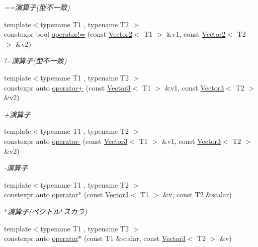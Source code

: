 \begin{DoxyCompactItemize}
\begin{DoxyCompactList}\small\item\em ==演算子(型不一致) \end{DoxyCompactList}\item 
{\footnotesize template$<$typename T1 , typename T2 $>$ }\\constexpr bool \mbox{\hyperlink{namespacesaki_a778d46d9fe6118407c686cc3c3c61ac7}{operator!=}} (const \mbox{\hyperlink{classsaki_1_1_vector2}{Vector2}}$<$ T1 $>$ \&v1, const \mbox{\hyperlink{classsaki_1_1_vector2}{Vector2}}$<$ T2 $>$ \&v2)
\begin{DoxyCompactList}\small\item\em !=演算子(型不一致) \end{DoxyCompactList}\item 
{\footnotesize template$<$typename T1 , typename T2 $>$ }\\constexpr auto \mbox{\hyperlink{namespacesaki_a482be906f8ccfd7fa303391e28e44f05}{operator+}} (const \mbox{\hyperlink{classsaki_1_1_vector3}{Vector3}}$<$ T1 $>$ \&v1, const \mbox{\hyperlink{classsaki_1_1_vector3}{Vector3}}$<$ T2 $>$ \&v2)
\begin{DoxyCompactList}\small\item\em +演算子 \end{DoxyCompactList}\item 
{\footnotesize template$<$typename T1 , typename T2 $>$ }\\constexpr auto \mbox{\hyperlink{namespacesaki_ab4e324d1879fdeb0737196f18a3b42e2}{operator-\/}} (const \mbox{\hyperlink{classsaki_1_1_vector3}{Vector3}}$<$ T1 $>$ \&v1, const \mbox{\hyperlink{classsaki_1_1_vector3}{Vector3}}$<$ T2 $>$ \&v2)
\begin{DoxyCompactList}\small\item\em -\/演算子 \end{DoxyCompactList}\item 
{\footnotesize template$<$typename T1 , typename T2 $>$ }\\constexpr auto \mbox{\hyperlink{namespacesaki_a7e8da947afb09174d52b0e4aaa185d71}{operator$\ast$}} (const \mbox{\hyperlink{classsaki_1_1_vector3}{Vector3}}$<$ T1 $>$ \&v, const T2 \&scalar)
\begin{DoxyCompactList}\small\item\em $\ast$演算子(ベクトル$\ast$スカラ) \end{DoxyCompactList}\item 
{\footnotesize template$<$typename T1 , typename T2 $>$ }\\constexpr auto \mbox{\hyperlink{namespacesaki_a74073980f30054780d16bbda306bb0c4}{operator$\ast$}} (const T1 \&scalar, const \mbox{\hyperlink{classsaki_1_1_vector3}{Vector3}}$<$ T2 $>$ \&v)

\end{DoxyCompactItemize}
